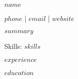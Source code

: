 \documentclass[11pt,a4paper]{article}
\begin{document}
\pagestyle{empty}

$name$

$phone$ | $email$ | $website$

$summary$

Skills: $skills$

$experience$

$education$
\end{document}
